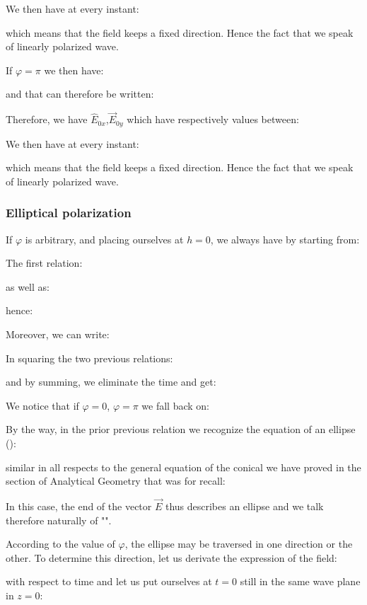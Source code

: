 	We then have at every instant:
	
	which means that the field keeps a fixed direction. Hence the fact that we speak of linearly polarized wave.

	If $\varphi=\pi$ we then have:
	
	and that can therefore be written:
	
	Therefore, we have $\hat{E}_{0x}$,$\vec{E}_{0y}$ which have respectively values between:
	
	We then have at every instant:
	
	which means that the field keeps a fixed direction. Hence the fact that we speak of linearly polarized wave.
	
	\subsubsection{Elliptical polarization}
	If $\varphi$ is arbitrary, and placing ourselves at $h=0$, we always have by starting from:
	
	The first relation:
	
	as well as:
	
	hence:
	
	Moreover, we can write:
	
	In squaring the two previous relations:
	
	and by summing, we eliminate the time and get:
	
	
	We notice that if $\varphi=0$, $\varphi=\pi$ we fall back on:
	
	By the way, in the prior previous relation we recognize the equation of an ellipse ():
	
	similar in all respects to the general equation of the conical we have proved in the section of Analytical Geometry that was for recall:
	
	In this case, the end of the vector $\vec{E}$ thus describes an ellipse and we talk therefore naturally of "".

	According to the value of $\varphi$, the ellipse may be traversed in one direction or the other. To determine this direction, let us derivate the expression of the field:
	
	with respect to time and let us put ourselves at $t=0$ still in the same wave plane in $z=0$:
	

